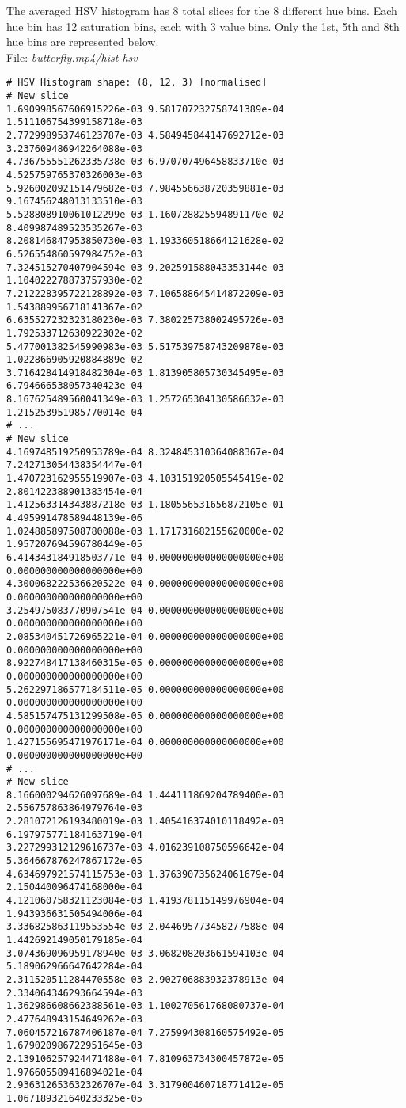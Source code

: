 The averaged HSV histogram has 8 total slices for the 8 different hue bins. Each hue bin has 12 saturation bins, each with 3 value bins. Only the 1st, 5th and 8th hue bins are represented below.\\

File: \underline{\textit{butterfly.mp4/hist-hsv}}

\begin{lstlisting}
# HSV Histogram shape: (8, 12, 3) [normalised]
# New slice
1.690998567606915226e-03 9.581707232758741389e-04 1.511106754399158718e-03
2.772998953746123787e-03 4.584945844147692712e-03 3.237609486942264088e-03
4.736755551262335738e-03 6.970707496458833710e-03 4.525759765370326003e-03
5.926002092151479682e-03 7.984556638720359881e-03 9.167456248013133510e-03
5.528808910061012299e-03 1.160728825594891170e-02 8.409987489523535267e-03
8.208146847953850730e-03 1.193360518664121628e-02 6.526554860597984752e-03
7.324515270407904594e-03 9.202591588043353144e-03 1.104022278873757930e-02
7.212228395722128892e-03 7.106588645414872209e-03 1.543889956718141367e-02
6.635527232323180230e-03 7.380225738002495726e-03 1.792533712630922302e-02
5.477001382545990983e-03 5.517539758743209878e-03 1.022866905920884889e-02
3.716428414918482304e-03 1.813905805730345495e-03 6.794666538057340423e-04
8.167625489560041349e-03 1.257265304130586632e-03 1.215253951985770014e-04
# ...
# New slice
4.169748519250953789e-04 8.324845310364088367e-04 7.242713054438354447e-04
1.470723162955519907e-03 4.103151920505545419e-02 2.801422388901383454e-04
1.412563314343887218e-03 1.180556531656872105e-01 4.495991478589448139e-06
1.024885897508780088e-03 1.171731682155620000e-02 1.957207694596780449e-05
6.414343184918503771e-04 0.000000000000000000e+00 0.000000000000000000e+00
4.300068222536620522e-04 0.000000000000000000e+00 0.000000000000000000e+00
3.254975083770907541e-04 0.000000000000000000e+00 0.000000000000000000e+00
2.085340451726965221e-04 0.000000000000000000e+00 0.000000000000000000e+00
8.922748417138460315e-05 0.000000000000000000e+00 0.000000000000000000e+00
5.262297186577184511e-05 0.000000000000000000e+00 0.000000000000000000e+00
4.585157475131299508e-05 0.000000000000000000e+00 0.000000000000000000e+00
1.427155695471976171e-04 0.000000000000000000e+00 0.000000000000000000e+00
# ...
# New slice
8.166000294626097689e-04 1.444111869204789400e-03 2.556757863864979764e-03
2.281072126193480019e-03 1.405416374010118492e-03 6.197975771184163719e-04
3.227299312129616737e-03 4.016239108750596642e-04 5.364667876247867172e-05
4.634697921574115753e-03 1.376390735624061679e-04 2.150440096474168000e-04
4.121060758321123084e-03 1.419378115149976904e-04 1.943936631505494006e-04
3.336825863119553554e-03 2.044695773458277588e-04 1.442692149050179185e-04
3.074369096959178940e-03 3.068208203661594103e-04 5.189062966647642284e-04
2.311520511284470558e-03 2.902706883932378913e-04 2.334064346293664594e-03
1.362986608662388561e-03 1.100270561768080737e-04 2.477648943154649262e-03
7.060457216787406187e-04 7.275994308160575492e-05 1.679020986722951645e-03
2.139106257924471488e-04 7.810963734300457872e-05 1.976605589416894021e-04
2.936312653632326707e-04 3.317900460718771412e-05 1.067189321640233325e-05
\end{lstlisting}

